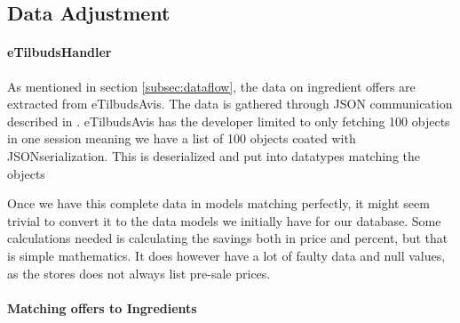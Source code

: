 \subsection{Data Adjustment}
\label{subsec:dataadjustment}

\paragraph{eTilbudsHandler}
As mentioned in section \ref{subsec:dataflow}, the data on ingredient offers are extracted from eTilbudsAvis. The data is gathered through JSON communication described in . eTilbudsAvis has the developer limited to only fetching 100 objects in one session meaning we have a list of 100 objects coated with JSONserialization. This is deserialized and put into datatypes matching the objects


Once we have this complete data in models matching perfectly, it might seem trivial to convert it to the data models we initially have for our database. Some calculations needed is calculating the savings both in price and percent, but that is simple mathematics. It does however have a lot of faulty data and null values, as the stores does not always list pre-sale prices. 

\paragraph{Matching offers to Ingredients}